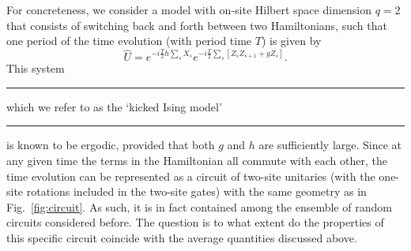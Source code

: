 \documentclass[aps,prb,twocolumn,superscriptaddress]{revtex4-1}
\renewcommand\textemdash{\leavevmode\unskip\kern0.8pt\rule[0.19\baselineskip]{8pt}{0.4pt}\kern1pt\ignorespaces}
\begin{document}
For concreteness, we consider a model with on-site Hilbert space dimension $q=2$ that consists of switching back and forth between two Hamiltonians, such that one period of the time evolution (with period time $T$) is given by
\begin{equation}\label{eq:Ising_def}
\hat U = e^{-i \frac{T}{2} h \sum_s X_s} e^{-i\frac{T}{2}\sum_s[Z_sZ_{s+1} + gZ_s]}.
\end{equation}
This system \textemdash which we refer to as the `kicked Ising model' \textemdash is known to be ergodic, provided that both $g$ and $h$ are sufficiently large. Since at any given time the terms in the Hamiltonian all commute with each other, the time evolution can be represented as a circuit of two-site unitaries (with the one-site rotations included in the two-site gates) with the same geometry as in Fig.~\ref{fig:circuit}. As such, it is in fact contained among the ensemble of random circuits considered before. The question is to what extent do the properties of this specific circuit coincide with the average quantities discussed above.
\end{document}
